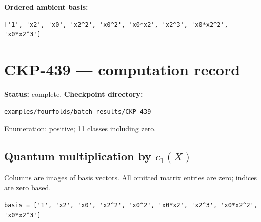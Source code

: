 \documentclass[10pt,a4paper]{article}
\begin{document}
\textbf{Ordered ambient basis:}
\begin{lstlisting}
['1', 'x2', 'x0', 'x2^2', 'x0^2', 'x0*x2', 'x2^3', 'x0*x2^2', 'x0*x2^3']
\end{lstlisting}

\clearpage\section*{CKP-439 --- computation record}
\textbf{Status:} complete.
\textbf{Checkpoint directory:}
\begin{lstlisting}
examples/fourfolds/batch_results/CKP-439
\end{lstlisting}

Enumeration: positive; 11 classes including zero.
\subsection*{Quantum multiplication by $c_1(X)$}
Columns are images of basis vectors. All omitted matrix entries are zero; indices are zero based.

\begin{lstlisting}
basis = ['1', 'x2', 'x0', 'x2^2', 'x0^2', 'x0*x2', 'x2^3', 'x0*x2^2', 'x0*x2^3']
\end{lstlisting}
\end{document}
